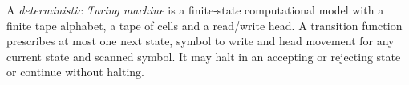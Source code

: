
A \emph{deterministic Turing machine} is a finite-state computational model with a finite tape alphabet, a tape of cells and a read/write head. A transition function prescribes at most one next state, symbol to write and head movement for any current state and scanned symbol. It may halt in an accepting or rejecting state or continue without halting.
